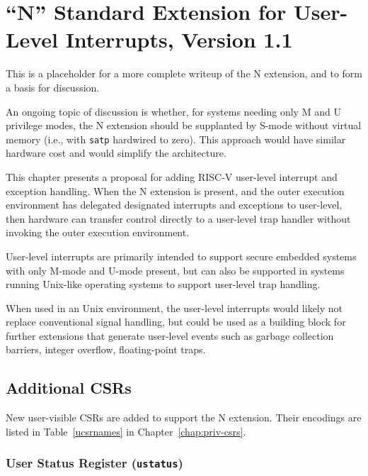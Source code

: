 \chapter{``N'' Standard Extension for User-Level Interrupts, Version 1.1}
\label{chap:n}

\begin{commentary}
  This is a placeholder for a more complete writeup of the N
  extension, and to form a basis for discussion.

  An ongoing topic of discussion is whether, for systems needing only M and
  U privilege modes, the N extension should be supplanted by S-mode without
  virtual memory (i.e., with {\tt satp} hardwired to zero).
  This approach would have similar hardware cost and would simplify the
  architecture.
\end{commentary}

This chapter presents a proposal for adding RISC-V user-level
interrupt and exception handling.  When the N extension is present,
and the outer execution environment has delegated designated
interrupts and exceptions to user-level, then hardware can transfer
control directly to a user-level trap handler without invoking the
outer execution environment.

\begin{commentary}
User-level interrupts are primarily intended to support secure
embedded systems with only M-mode and U-mode present, but can also be
supported in systems running Unix-like operating systems to support
user-level trap handling.

When used in an Unix environment, the user-level interrupts would
likely not replace conventional signal handling, but could be used as
a building block for further extensions that generate user-level
events such as garbage collection barriers, integer overflow,
floating-point traps.
\end{commentary}

\section{Additional CSRs}

New user-visible CSRs are added to support the N extension.
Their encodings are listed in Table~\ref{ucsrnames} in
Chapter~\ref{chap:priv-csrs}.

\subsection{User Status Register ({\tt ustatus})}

